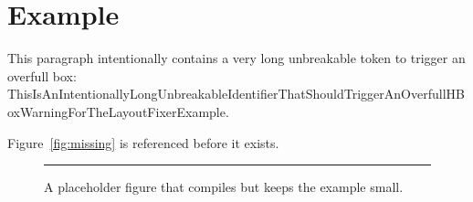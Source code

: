 \documentclass{article}
\begin{document}
\section{Example}

This paragraph intentionally contains a very long unbreakable token to trigger an overfull box:
\noindent ThisIsAnIntentionallyLongUnbreakableIdentifierThatShouldTriggerAnOverfullHBoxWarningForTheLayoutFixerExample.

Figure~\ref{fig:missing} is referenced before it exists.

\begin{figure}[t]
\centering
\rule{\linewidth}{1.2in}
\caption{A placeholder figure that compiles but keeps the example small.}
\label{fig:placeholder}
\end{figure}

\lipsum[1]
\end{document}
